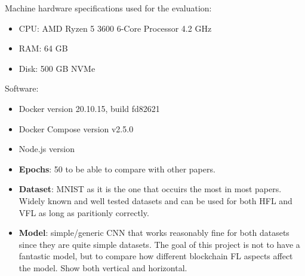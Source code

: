 
Machine hardware specifications used for the evaluation:

\begin{itemize}
    \item CPU: AMD Ryzen 5 3600 6-Core Processor 4.2 GHz
    \item RAM: 64 GB
    \item Disk: 500 GB NVMe
\end{itemize}

Software:

\begin{itemize}
    \item Docker version 20.10.15, build fd82621
    \item Docker Compose version v2.5.0
    \item Node.js version 
\end{itemize}

\begin{itemize}
    \item \textbf{Epochs}: 50 to be able to compare with other papers.
    
    \item \textbf{Dataset}: MNIST \cite{lecun2010mnist} as it is the one that occuirs the most in most papers. Widely known and well tested datasets and can be used for both HFL and VFL as long as paritionly correctly.
    
    \item \textbf{Model}: simple/generic CNN that works reasonably fine for both datasets since they are quite simple datasets. The goal of this project is not to have a fantastic model, but to compare how different blockchain FL aspects affect the model. Show both vertical and horizontal.
\end{itemize}
